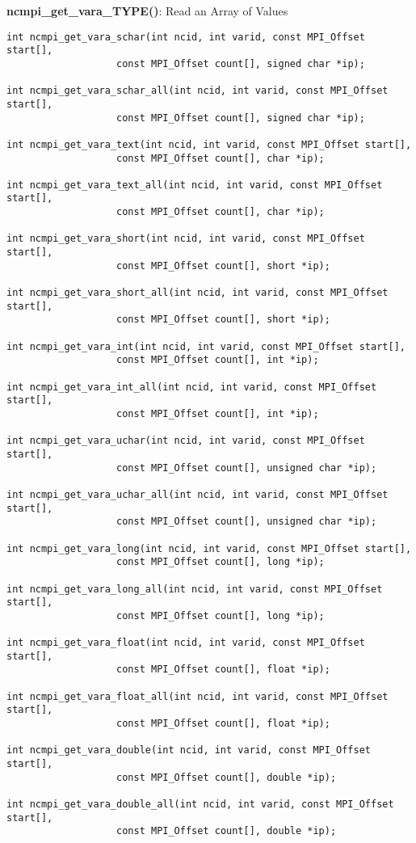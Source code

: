 {\bf ncmpi\_get\_vara\_TYPE()}: Read an Array of Values

\begin{verbatim}
int ncmpi_get_vara_schar(int ncid, int varid, const MPI_Offset start[],
                   const MPI_Offset count[], signed char *ip);

int ncmpi_get_vara_schar_all(int ncid, int varid, const MPI_Offset start[],
                   const MPI_Offset count[], signed char *ip);

int ncmpi_get_vara_text(int ncid, int varid, const MPI_Offset start[],
                   const MPI_Offset count[], char *ip);

int ncmpi_get_vara_text_all(int ncid, int varid, const MPI_Offset start[],
                   const MPI_Offset count[], char *ip);

int ncmpi_get_vara_short(int ncid, int varid, const MPI_Offset start[],
                   const MPI_Offset count[], short *ip);

int ncmpi_get_vara_short_all(int ncid, int varid, const MPI_Offset start[],
                   const MPI_Offset count[], short *ip);

int ncmpi_get_vara_int(int ncid, int varid, const MPI_Offset start[],
                   const MPI_Offset count[], int *ip);

int ncmpi_get_vara_int_all(int ncid, int varid, const MPI_Offset start[],
                   const MPI_Offset count[], int *ip);

int ncmpi_get_vara_uchar(int ncid, int varid, const MPI_Offset start[],
                   const MPI_Offset count[], unsigned char *ip);

int ncmpi_get_vara_uchar_all(int ncid, int varid, const MPI_Offset start[],
                   const MPI_Offset count[], unsigned char *ip);

int ncmpi_get_vara_long(int ncid, int varid, const MPI_Offset start[],
                   const MPI_Offset count[], long *ip);

int ncmpi_get_vara_long_all(int ncid, int varid, const MPI_Offset start[],
                   const MPI_Offset count[], long *ip);

int ncmpi_get_vara_float(int ncid, int varid, const MPI_Offset start[],
                   const MPI_Offset count[], float *ip);

int ncmpi_get_vara_float_all(int ncid, int varid, const MPI_Offset start[],
                   const MPI_Offset count[], float *ip);

int ncmpi_get_vara_double(int ncid, int varid, const MPI_Offset start[],
                   const MPI_Offset count[], double *ip);

int ncmpi_get_vara_double_all(int ncid, int varid, const MPI_Offset start[],
                   const MPI_Offset count[], double *ip);
\end{verbatim}


